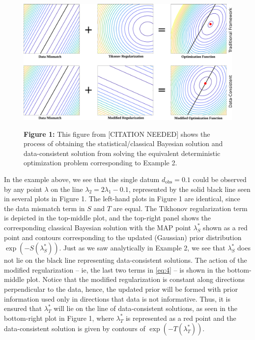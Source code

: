 \documentclass{amsart}
\begin{document}
\vspace{.125cm}


\begin{figure} 
\includegraphics[width=\textwidth]{Regularization-all-in-one.pdf}

\textbf{Figure 1:} This figure from [CITATION NEEDED] shows the process of obtaining the statistical/classical Bayesian solution and data-consistent solution from solving the equivalent deterministic optimization problem corresponding to Example 2.
\end{figure}

In the example above, we see that the single datum $d_\text{obs}=0.1$ could be observed by any point $\lambda$ on the line $\lambda_2=2\lambda_1-0.1$, represented by the solid black line seen in several plots in Figure 1. The left-hand plots in Figure 1 are identical, since the data mismatch term in $S$ and $T$ are equal. The Tikhonov regularization term is depicted in the top-middle plot, and the top-right panel shows the corresponding classical Bayesian solution with the MAP point $\lambda_S^*$ shown as a red point and contours corresponding to the updated (Gaussian) prior distribution $\exp(-S(\lambda_S^*))$. 
Just as we saw analytically in Example 2, we see that $\lambda_S^*$ does not lie on the black line representing data-consistent solutions. The action of the modified regularization -- ie, the last two terms in \eqref{eq:4} -- is shown in the bottom-middle plot. Notice that the modified regularization is constant along directions perpendicular to the data, hence, the updated prior will be formed with prior information used only in directions that data is not informative. Thus, it is ensured that $\lambda_T^*$ will lie on the line of data-consistent solutions, as seen in the bottom-right plot in Figure 1, where $\lambda_T^*$ is represented as a red point and the data-consistent solution is given by contours of $ \exp(-T(\lambda_T^*))$.
\end{document}
